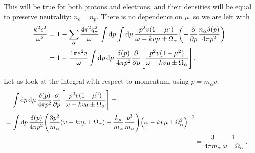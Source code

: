 \documentclass[main.tex]{subfiles}
\begin{document}
This will be true for both protons and electrons, and their densities will be equal to preserve neutrality: \(n_e = n_p\). 
There is no dependence on \(\mu \), so we are left with 
%
\begin{align}
\frac{k^2 c^2}{\omega^2} &= 
1 - \sum _{\alpha } \frac{4 \pi^2 q_\alpha^2}{\omega } \int \dd{p} \int \dd{\mu } 
\frac{p^2 v (1 - \mu^2)}{\omega - kv \mu \pm \Omega _\alpha }
\qty(- \pdv{}{p} \frac{n_\alpha \delta (p)}{4 \pi p^2})  \\
&= 1 - \frac{4 \pi e^2 n}{\omega } \int \dd{p} \dd{\mu }
\frac{ \delta (p)}{4 \pi p^2} \pdv{}{p}  \qty[\frac{p^2 v (1 - \mu^2)}{\omega - k v \mu \pm \Omega _\alpha }]
\,.
\end{align}

Let us look at the integral with respect to momentum, using \(p = m_\alpha v\): 
%
\begin{align}
\begin{split}
&\phantom{=}\ \int \dd{p} \dd{\mu }
\frac{ \delta (p)}{4 \pi p^2} \pdv{}{p}  \qty[\frac{p^2 v (1 - \mu^2)}{\omega - k v \mu \pm \Omega _\alpha }]= \\
&= \int \dd{p} \frac{ \delta (p)}{4 \pi p^2} \qty( \frac{3 p^2}{m_\alpha } (\omega - k v \mu \pm \Omega _\alpha ) + \frac{k_\mu }{m_\alpha } \frac{p^3}{m_\alpha }) \qty(\omega - k v \mu \pm \Omega_\alpha^2)^{-1} 
\end{split}  \\
&= \frac{3}{4 \pi m_\alpha } \frac{1}{\omega \pm \Omega _\alpha }
\,.
\end{align}
\end{document}
